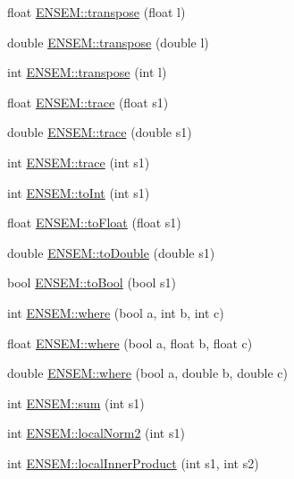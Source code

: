 \begin{DoxyCompactItemize}
float \mbox{\hyperlink{group__simpleword_gaae1addc48b1db94779e7c31a1a4841fc}{E\+N\+S\+E\+M\+::transpose}} (float l)
\item 
double \mbox{\hyperlink{group__simpleword_ga730a338e3cb8cbd8defeefca69e6f665}{E\+N\+S\+E\+M\+::transpose}} (double l)
\item 
int \mbox{\hyperlink{group__simpleword_ga7e1346dd429051023361db04dd9b2f27}{E\+N\+S\+E\+M\+::transpose}} (int l)
\item 
float \mbox{\hyperlink{group__simpleword_ga374e26c049de5fb2d6fa75fc7658afff}{E\+N\+S\+E\+M\+::trace}} (float s1)
\item 
double \mbox{\hyperlink{group__simpleword_ga42388e8cf5ff017e87fde24804dc5157}{E\+N\+S\+E\+M\+::trace}} (double s1)
\item 
int \mbox{\hyperlink{group__simpleword_ga1cfdc081dea5ca70a94e611e24767931}{E\+N\+S\+E\+M\+::trace}} (int s1)
\item 
int \mbox{\hyperlink{group__simpleword_ga8069a9dba7bde8afd620565f8628fb68}{E\+N\+S\+E\+M\+::to\+Int}} (int s1)
\item 
float \mbox{\hyperlink{group__simpleword_ga6f3aac1379a793726dc2c71317d99422}{E\+N\+S\+E\+M\+::to\+Float}} (float s1)
\item 
double \mbox{\hyperlink{group__simpleword_ga14c2748b5624a157ba57c143b2b67072}{E\+N\+S\+E\+M\+::to\+Double}} (double s1)
\item 
bool \mbox{\hyperlink{group__simpleword_gacd3ee735ab005c2fc3af8bdd6c3aa9a6}{E\+N\+S\+E\+M\+::to\+Bool}} (bool s1)
\item 
int \mbox{\hyperlink{group__simpleword_gaca8f67f6f4b42cad187907674810e9a6}{E\+N\+S\+E\+M\+::where}} (bool a, int b, int c)
\item 
float \mbox{\hyperlink{group__simpleword_ga3fc05e05bd31e7772dd36892a7641c5b}{E\+N\+S\+E\+M\+::where}} (bool a, float b, float c)
\item 
double \mbox{\hyperlink{group__simpleword_gad33b774b0681bc74cb80ea6e58ca4992}{E\+N\+S\+E\+M\+::where}} (bool a, double b, double c)
\item 
int \mbox{\hyperlink{group__simpleword_ga971787584a79f9a0e9938d4df2021d3f}{E\+N\+S\+E\+M\+::sum}} (int s1)
\item 
int \mbox{\hyperlink{group__simpleword_gae87effe93f43b7cdc27ed0c1e7cff904}{E\+N\+S\+E\+M\+::local\+Norm2}} (int s1)
\item 
int \mbox{\hyperlink{group__simpleword_ga951b44f16b8a7d800116448b40a3e46d}{E\+N\+S\+E\+M\+::local\+Inner\+Product}} (int s1, int s2)
\item 

\end{DoxyCompactItemize}
